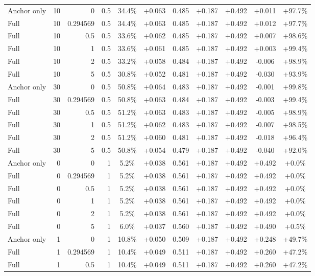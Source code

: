 \begin{table}[htbp]
\begin{tabular}{lrrrccccccc}
Anchor only & 10 & 0 & 0.5 & 34.4\% & +0.063 & 0.485 & +0.187 & +0.492 & +0.011 & +97.7\% \\
Full & 10 & 0.294569 & 0.5 & 34.4\% & +0.063 & 0.485 & +0.187 & +0.492 & +0.012 & +97.7\% \\
Full & 10 & 0.5 & 0.5 & 33.6\% & +0.062 & 0.485 & +0.187 & +0.492 & +0.007 & +98.6\% \\
Full & 10 & 1 & 0.5 & 33.6\% & +0.061 & 0.485 & +0.187 & +0.492 & +0.003 & +99.4\% \\
Full & 10 & 2 & 0.5 & 33.2\% & +0.058 & 0.484 & +0.187 & +0.492 & -0.006 & +98.9\% \\
Full & 10 & 5 & 0.5 & 30.8\% & +0.052 & 0.481 & +0.187 & +0.492 & -0.030 & +93.9\% \\
Anchor only & 30 & 0 & 0.5 & 50.8\% & +0.064 & 0.483 & +0.187 & +0.492 & -0.001 & +99.8\% \\
Full & 30 & 0.294569 & 0.5 & 50.8\% & +0.063 & 0.484 & +0.187 & +0.492 & -0.003 & +99.4\% \\
Full & 30 & 0.5 & 0.5 & 51.2\% & +0.063 & 0.483 & +0.187 & +0.492 & -0.005 & +98.9\% \\
Full & 30 & 1 & 0.5 & 51.2\% & +0.062 & 0.483 & +0.187 & +0.492 & -0.007 & +98.5\% \\
Full & 30 & 2 & 0.5 & 51.2\% & +0.060 & 0.481 & +0.187 & +0.492 & -0.018 & +96.4\% \\
Full & 30 & 5 & 0.5 & 50.8\% & +0.054 & 0.479 & +0.187 & +0.492 & -0.040 & +92.0\% \\
Anchor only & 0 & 0 & 1 & 5.2\% & +0.038 & 0.561 & +0.187 & +0.492 & +0.492 & +0.0\% \\
Full & 0 & 0.294569 & 1 & 5.2\% & +0.038 & 0.561 & +0.187 & +0.492 & +0.492 & +0.0\% \\
Full & 0 & 0.5 & 1 & 5.2\% & +0.038 & 0.561 & +0.187 & +0.492 & +0.492 & +0.0\% \\
Full & 0 & 1 & 1 & 5.2\% & +0.038 & 0.561 & +0.187 & +0.492 & +0.492 & +0.0\% \\
Full & 0 & 2 & 1 & 5.2\% & +0.038 & 0.561 & +0.187 & +0.492 & +0.492 & +0.0\% \\
Full & 0 & 5 & 1 & 6.0\% & +0.037 & 0.560 & +0.187 & +0.492 & +0.490 & +0.5\% \\
Anchor only & 1 & 0 & 1 & 10.8\% & +0.050 & 0.509 & +0.187 & +0.492 & +0.248 & +49.7\% \\
Full & 1 & 0.294569 & 1 & 10.4\% & +0.049 & 0.511 & +0.187 & +0.492 & +0.260 & +47.2\% \\
Full & 1 & 0.5 & 1 & 10.4\% & +0.049 & 0.511 & +0.187 & +0.492 & +0.260 & +47.2\% \\

\end{tabular}
\end{table}
